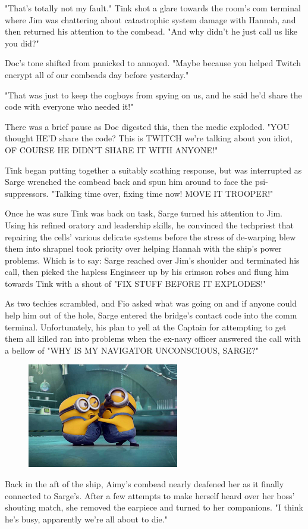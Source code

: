 "That's totally not my fault." Tink shot a glare towards the room's com terminal where Jim was chattering about catastrophic system damage with Hannah, and then returned his attention to the combead. 
"And why didn't he just call us like you did?"

Doc's tone shifted from panicked to annoyed. 
"Maybe because you helped Twitch encrypt all of our combeads day before yesterday."

"That was just to keep the cogboys from spying on us, and he said he'd share the code with everyone who needed it!"

There was a brief pause as Doc digested this, then the medic exploded. 
"YOU thought HE'D share the code? 
This is TWITCH we're talking about you idiot, OF COURSE HE DIDN'T SHARE IT WITH ANYONE!"

Tink began putting together a suitably scathing response, but was interrupted as Sarge wrenched the combead back and spun him around to face the psi-suppressors. 
"Talking time over, fixing time now! 
MOVE IT TROOPER!" 

Once he was sure Tink was back on task, Sarge turned his attention to Jim. 
Using his refined oratory and leadership skills, he convinced the techpriest that repairing the cells' various delicate systems before the stress of de-warping blew them into shrapnel took priority over helping Hannah with the ship's power problems. 
Which is to say: 
Sarge reached over Jim's shoulder and terminated his call, then picked the hapless Enginseer up by his crimson robes and flung him towards Tink with a shout of "FIX STUFF BEFORE IT EXPLODES!"

As two techies scrambled, and Fio asked what was going on and if anyone could help him out of the hole, Sarge entered the bridge's contact code into the comm terminal. 
Unfortunately, his plan to yell at the Captain for attempting to get them all killed ran into problems when the ex-navy officer answered the call with a bellow of "WHY IS MY NAVIGATOR UNCONSCIOUS, SARGE?"

\begin{figure}
	\begin{center}
		\includegraphics[width=\figwidth]{pics/13/12.png}
	\end{center}
\end{figure}
Back in the aft of the ship, Aimy's combead nearly deafened her as it finally connected to Sarge's. 
After a few attempts to make herself heard over her boss' shouting match, she removed the earpiece and turned to her companions. 
"I think he's busy, apparently we're all about to die."

